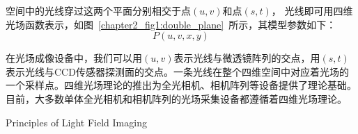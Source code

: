 空间中的光线穿过这两个平面分别相交于点$(u, v)$和点$(s, t)$，
光线即可用四维光场函数表示，如图~\ref{chapter2_fig1:double_plane}~所示，其模型参数如下：
\begin{equation}
	P(u, v, x, y)
\end{equation}\par
在光场成像设备中，我们可以用$(u, v)$表示光线与微透镜阵列的交点，用$(s, t)$表示光线与CCD传感器探测面的交点。一条光线在整个四维空间中对应着光场的一个采样点。四维光场理论的推出为全光相机、相机阵列等设备提供了理论基础。目前，大多数单体全光相机和相机阵列的光场采集设备都遵循着四维光场理论。
%
%




{Principles of Light Field Imaging}

